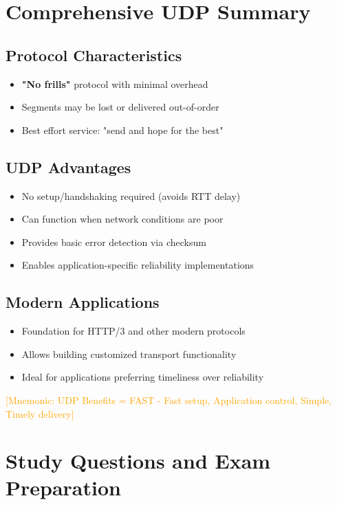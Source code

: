 \documentclass[12pt]{article}
\begin{document}
\section{Comprehensive UDP Summary}

\subsection{Protocol Characteristics}
\begin{itemize}
    \item \textbf{"No frills"} protocol with minimal overhead
    \item Segments may be lost or delivered out-of-order
    \item Best effort service: "send and hope for the best"
\end{itemize}

\subsection{UDP Advantages}
\begin{itemize}
    \item No setup/handshaking required (avoids RTT delay)
    \item Can function when network conditions are poor
    \item Provides basic error detection via checksum
    \item Enables application-specific reliability implementations
\end{itemize}

\subsection{Modern Applications}
\begin{itemize}
    \item Foundation for HTTP/3 and other modern protocols
    \item Allows building customized transport functionality
    \item Ideal for applications preferring timeliness over reliability
\end{itemize}

\textcolor{orange}{[Mnemonic: UDP Benefits = FAST - Fast setup, Application control, Simple, Timely delivery]}

\section{Study Questions and Exam Preparation}
\end{document}
